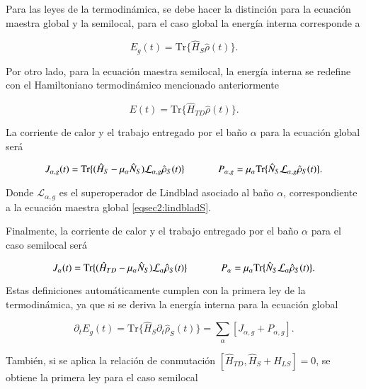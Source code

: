 Para las leyes de la termodinámica, se debe hacer la distinción para la ecuación maestra global y la semilocal, para el caso global la energía interna corresponde a 

\begin{equation*}
    E_{g}(t) = \text{Tr}\{\hat{H}_{S}\hat{\rho}(t) \}.
\end{equation*}

Por otro lado, para la ecuación maestra semilocal, la energía interna se redefine con el Hamiltoniano termodinámico mencionado anteriormente 

\begin{equation*}
    E(t) = \text{Tr}\{\hat{H}_{TD}\hat{\rho}(t) \}.
\end{equation*}

La corriente de calor y el trabajo entregado por el baño $\alpha$ para la ecuación global será

\begin{equation*}
    J_{\alpha,g}(t) = \text{Tr}\{(\hat{H}_{S} - \mu_{\alpha}\hat{N}_S)\mathcal{L}_{\alpha,g}\hat{\rho}_{S}(t) \} \hspace{12mm} P_{\alpha,g} = \mu_{\alpha} \text{Tr}\{\hat{N}_{S}\mathcal{L}_{\alpha,g}\hat{\rho}_{S}(t) \}.
\end{equation*}

Donde $\mathcal{L}_{\alpha,g}$ es el superoperador de Lindblad asociado al baño $\alpha$, correspondiente a la ecuación maestra global \ref{eqsec2:lindbladS}.

Finalmente, la corriente de calor y el trabajo entregado por el baño $\alpha$ para el caso semilocal será

\begin{equation*}
    J_{\alpha}(t) = \text{Tr}\{(\hat{H}_{TD} - \mu_{\alpha}\hat{N}_S)\mathcal{L}_{\alpha}\hat{\rho}_{S}(t) \} \hspace{12mm} P_{\alpha} = \mu_{\alpha} \text{Tr}\{\hat{N}_{S}\mathcal{L}_{\alpha}\hat{\rho}_{S}(t) \}.
\end{equation*}

Estas definiciones automáticamente cumplen con la primera ley de la termodinámica, ya que si se deriva la energía interna para la ecuación global 

\begin{equation*}
    \partial_{t}E_{g}(t) = \text{Tr}\{ \hat{H}_{S}\partial_{t}\hat{\rho}_{S}(t) \} = \sum_{\alpha}[J_{\alpha,g} + P_{\alpha,g}].
\end{equation*}

También, si se aplica la relación de conmutación $[\hat{H}_{TD},\hat{H}_{S} + \hat{H}_{LS}] = 0$, se obtiene la primera ley para el caso semilocal 

